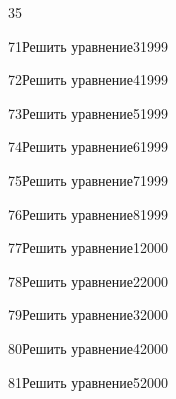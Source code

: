 \begin{TrigSourcePage}{35}
\begin{TrigExercise}{71}{Решить уравнение}{3}{1999}
\end{TrigExercise}
\begin{TrigExercise}{72}{Решить уравнение}{4}{1999}
\end{TrigExercise}
\begin{TrigExercise}{73}{Решить уравнение}{5}{1999}
\end{TrigExercise}
\begin{TrigExercise}{74}{Решить уравнение}{6}{1999}
\end{TrigExercise}
\begin{TrigExercise}{75}{Решить уравнение}{7}{1999}
\end{TrigExercise}
\begin{TrigExercise}{76}{Решить уравнение}{8}{1999}
\end{TrigExercise}
\begin{TrigExercise}{77}{Решить уравнение}{1}{2000}
\end{TrigExercise}
\begin{TrigExercise}{78}{Решить уравнение}{2}{2000}
\end{TrigExercise}
\begin{TrigExercise}{79}{Решить уравнение}{3}{2000}
\end{TrigExercise}
\begin{TrigExercise}{80}{Решить уравнение}{4}{2000}
\end{TrigExercise}
\begin{TrigExercise}{81}{Решить уравнение}{5}{2000}

\end{TrigExercise}
\end{TrigSourcePage}
